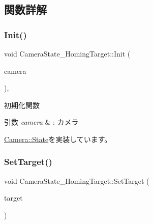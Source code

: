 \subsection{関数詳解}
\mbox{\label{class_camera_state___homing_target_a9222190a5f26d564e99623b05941d382}} 
\subsubsection{\texorpdfstring{Init()}{Init()}}
{\footnotesize\ttfamily void Camera\+State\+\_\+\+Homing\+Target\+::\+Init (\begin{DoxyParamCaption}\item[{\mbox{\hyperlink{class_camera}{Camera}} $\ast$}]{camera }\end{DoxyParamCaption})\hspace{0.3cm}{\ttfamily [override]}, {\ttfamily [virtual]}}



初期化関数 


\begin{DoxyParams}{引数}
{\em camera} & \+: カメラ \\
\hline
\end{DoxyParams}


\mbox{\hyperlink{class_camera_1_1_state_aa1b81471ab15e64b3117ffe7de9560ff}{Camera\+::\+State}}を実装しています。

\mbox{\label{class_camera_state___homing_target_a5beacf25aaff9547b5c4e32cec698e28}} 
\subsubsection{\texorpdfstring{Set\+Target()}{SetTarget()}}
{\footnotesize\ttfamily void Camera\+State\+\_\+\+Homing\+Target\+::\+Set\+Target (\begin{DoxyParamCaption}\item[{\mbox{\hyperlink{class_game_object_base}{Game\+Object\+Base}} $\ast$}]{target }\end{DoxyParamCaption})\hspace{0.3cm}{\ttfamily [inline]}}

